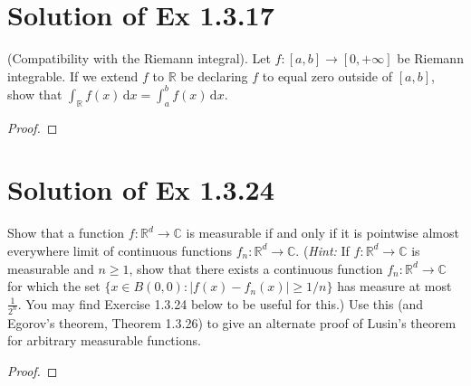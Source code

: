 \documentclass[reqno,a4paper,10pt]{amsart}
\newcommand\dif{\,\mathrm{d}}
\newcommand\Rnum{\mathbb{R}}
\newcommand{\abs}[1]{\left\vert#1\right\vert}
\begin{document}
\section{Solution of Ex 1.3.17}
(Compatibility with the Riemann integral). Let $f:[a,b]\to [0,+\infty]$ be  Riemann integrable. If we extend $f$ to $\Rnum$ be declaring $f$ to equal zero outside of $[a,b]$, show that $\int_\Rnum f(x)\dif x=\int_a^b f(x)\dif x$.
\begin{proof}

\end{proof}




\section{Solution of Ex 1.3.24}
Show that a function $f:\Rnum^d\to \mathbb{C}$ is measurable if and only if it is pointwise almost everywhere limit of continuous functions $f_n:\Rnum^d\to \mathbb{C}$. (\textit{Hint:} If $f:\Rnum^d\to\mathbb{C}$ is measurable and $n\geq 1$, show that there exists a continuous function $f_n:\Rnum^d\to \mathbb{C}$ for which the set $\{x\in B(0,0):\abs{f(x)-f_n(x)}\geq 1/n\}$ has measure at most $\frac{1}{2^n}$. You may find Exercise 1.3.24 below to be useful for this.) Use this (and Egorov's theorem, Theorem 1.3.26) to give an alternate proof of Lusin's theorem for arbitrary measurable functions.
\begin{proof}

\end{proof}
\end{document}
